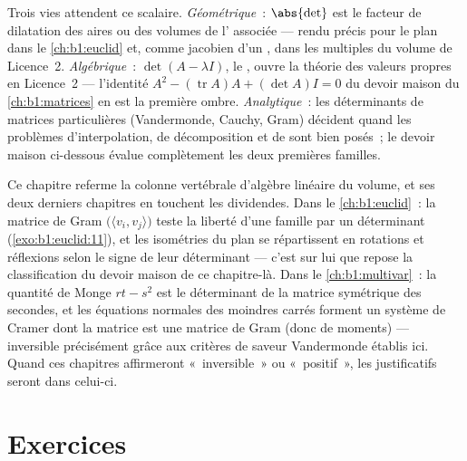 \begin{remark}
\label{rem:b1:det:whereused}
Trois vies attendent ce scalaire. \emph{Géométrique}~: $\abs{\det}$ est
le facteur de dilatation des aires ou des volumes de l'
associée --- rendu précis pour le plan dans le \cref{ch:b1:euclid} et,
comme jacobien d'un , dans les 
multiples du volume de Licence~2. \emph{Algébrique}~:
$\det(A - \lambda I)$, le , ouvre la théorie
des valeurs propres en Licence~2 --- l'identité
$A^2 - (\operatorname{tr} A)A + (\det A)I = 0$ du devoir maison du
\cref{ch:b1:matrices} en est la première ombre.
\emph{Analytique}~: les déterminants de matrices particulières
(Vandermonde, Cauchy, Gram) décident quand les problèmes
d'interpolation, de décomposition et de  sont bien posés~; le
devoir maison ci-dessous évalue complètement les deux premières
familles.
\end{remark}

\begin{remark}
\label{rem:b1:det:perspectives}
Ce chapitre referme la colonne vertébrale d'algèbre linéaire du
volume, et ses deux derniers chapitres en touchent les dividendes.
Dans le \cref{ch:b1:euclid}~: la matrice de Gram
$\bigl(\langle v_i, v_j\rangle\bigr)$ teste la liberté d'une famille
par un déterminant (\cref{exo:b1:euclid:11}), et les isométries du
plan se répartissent en rotations et réflexions selon le signe de leur
déterminant --- c'est sur lui que repose la classification du devoir
maison de ce chapitre-là. Dans le \cref{ch:b1:multivar}~: la quantité de Monge $rt -
s^2$ est le déterminant de la matrice symétrique des 
secondes, et les équations normales des moindres carrés forment un
système de Cramer dont la matrice est une matrice de Gram (donc de
moments) --- inversible précisément grâce aux critères de saveur
Vandermonde établis ici. Quand ces chapitres affirmeront
«~inversible~» ou «~positif~», les justificatifs seront dans celui-ci.
\end{remark}

\section{Exercices}

